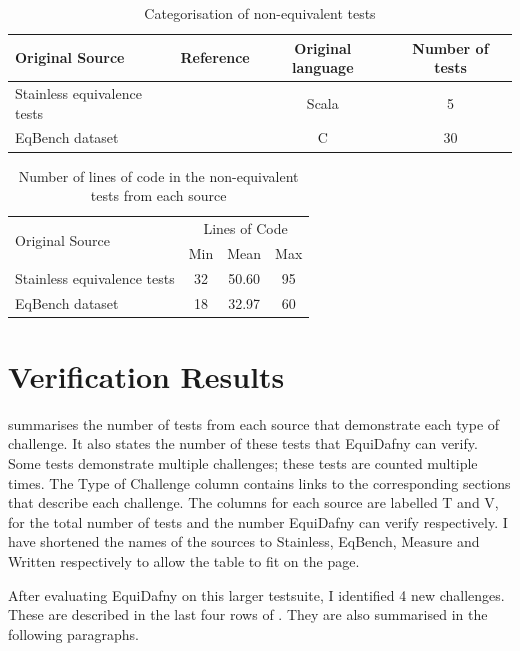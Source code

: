 \begin{table}[ht]
  \centering
  \begin{tabular}{ lccc }
    \toprule
    Original Source & Reference & Original language & Number of tests \\
    \midrule
    Stainless equivalence tests & \parencite{StainlessFrontendsBenchmarks} & Scala & 5 \\
    EqBench dataset & \parencite{badihiEqBenchDatasetEquivalent2021} & C & 30 \\
    \bottomrule
  \end{tabular}
  \caption{Categorisation of non-equivalent tests}
  \label{tbl:non-equivalent-categorisation}
\end{table}

\begin{table}[ht]
  \centering
  \begin{tabular}{ lccc }
    \toprule
    \multirow{2}{*}{Original Source} & \multicolumn{3}{c}{Lines of Code} \\
    & Min & Mean & Max \\
    \midrule
    Stainless equivalence tests & 32 & 50.60 & 95 \\
    EqBench dataset & 18 & 32.97 & 60 \\
    \bottomrule
  \end{tabular}
  \caption{Number of lines of code in the non-equivalent tests from each source}
  \label{tbl:nonequivalent-tests-loc}
\end{table}

\section{Verification Results}

 summarises the number of tests from each source that demonstrate each type of challenge. It also states the number of these tests that EquiDafny can verify. Some tests demonstrate multiple challenges; these tests are counted multiple times. The Type of Challenge column contains links to the corresponding sections that describe each challenge. The columns for each source are labelled T and V, for the total number of tests and the number EquiDafny can verify respectively. I have shortened the names of the sources to Stainless, EqBench, Measure and Written respectively to allow the table to fit on the page.

After evaluating EquiDafny on this larger testsuite, I identified 4 new challenges. These are described in the last four rows of . They are also summarised in the following paragraphs.

